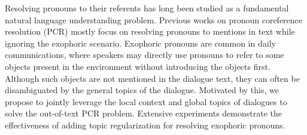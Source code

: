 Resolving pronouns to their referents has long been studied as a fundamental natural language understanding problem. Previous works on pronoun coreference resolution (PCR) mostly focus on resolving pronouns to mentions in text while ignoring the exophoric scenario. Exophoric pronouns are common in daily communications, where speakers may directly use pronouns to refer to some objects present in the environment without introducing the objects first. Although such objects are not mentioned in the dialogue text, they can often be disambiguated by the general topics of the dialogue. Motivated by this, we propose to jointly leverage the local context and global topics of dialogues to solve the out-of-text PCR problem. Extensive experiments demonstrate the effectiveness of adding topic regularization for resolving exophoric pronouns.
